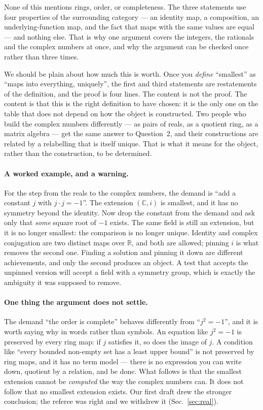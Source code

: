 \documentclass[aps,prd,preprint,superscriptaddress,amsmath,amssymb]{revtex4-2}
\begin{document}
None of this mentions rings, order, or completeness.  The three statements use
four properties of the surrounding category --- an identity map, a composition,
an underlying-function map, and the fact that maps with the same values are equal
--- and nothing else.  That is why one argument covers the integers, the
rationals and the complex numbers at once, and why the argument can be checked
once rather than three times.

We should be plain about how much this is worth.  Once you \emph{define}
``smallest'' as ``maps into everything, uniquely'', the first and third
statements are restatements of the definition, and the proof is four lines.  The
content is not the proof.  The content is that this is the right definition to
have chosen: it is the only one on the table that does not depend on how the
object is constructed.  Two people who build the complex numbers differently --- as
pairs of reals, as a quotient ring, as a matrix algebra --- get the same answer to
Question~2, and their constructions are related by a relabelling that is itself
unique.  That is what it means for the object, rather than the construction, to be
determined.

\paragraph{A worked example, and a warning.}
For the step from the reals to the complex numbers, the demand is ``add a constant
$j$ with $j\cdot j=-1$''.  The extension $(\mathbb{C},i)$ is smallest, and it has no
symmetry beyond the identity.  Now drop the constant from the demand and ask only
that \emph{some} square root of $-1$ exists.  The same field is still an
extension, but it is no longer smallest: the comparison is no longer unique.
Identity and complex conjugation are two distinct maps over $\mathbb{R}$, and both
are allowed; pinning $i$ is what removes the second one.  Finding a solution and
pinning it down are different achievements, and only the second produces an
object.  A test that accepts the unpinned version will accept a field with a
symmetry group, which is exactly the ambiguity it was supposed to remove.

\paragraph{One thing the argument does not settle.}
The demand ``the order is complete'' behaves differently from ``$j^2=-1$'', and it
is worth saying why in words rather than symbols.  An equation like $j^2=-1$ is
preserved by every ring map: if $j$ satisfies it, so does the image of $j$.  A
condition like ``every bounded non-empty set has a least upper bound'' is not
preserved by ring maps, and it has no term model --- there is no expression you can
write down, quotient by a relation, and be done.  What follows is that the
smallest extension cannot be \emph{computed} the way the complex numbers can.  It
does not follow that no smallest extension exists.  Our first draft drew the
stronger conclusion; the referee was right and we withdrew it
(Sec.~\ref{sec:real}).
\end{document}
